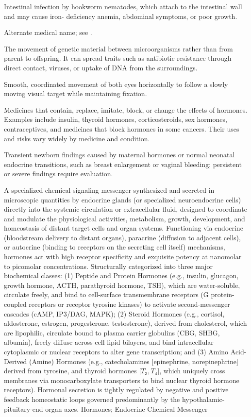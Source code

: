  Intestinal infection by hookworm nematodes, which attach to the intestinal wall and may cause iron-
deficiency anemia, abdominal symptoms, or poor growth.

 Alternate medical name; see .

 The movement of genetic material between microorganisms rather than from parent to offspring. It can spread traits such as antibiotic resistance through direct contact, viruses, or uptake of DNA from the surroundings.

 Smooth, coordinated movement of both eyes horizontally to follow a slowly moving visual target while maintaining fixation.

 Medicines that contain, replace, imitate, block, or change the effects of hormones. Examples include insulin, thyroid hormones, corticosteroids, sex hormones, contraceptives, and medicines that block hormones in some cancers. Their uses and risks vary widely by medicine and condition.

 Transient newborn findings caused by maternal hormones or normal neonatal endocrine transitions, such as breast enlargement or vaginal bleeding; persistent or severe findings require evaluation.

 A specialized chemical signaling messenger synthesized and secreted in microscopic quantities by endocrine glands (or specialized neuroendocrine cells) directly into the systemic circulation or extracellular fluid, designed to coordinate and modulate the physiological activities, metabolism, growth, development, and homeostasis of distant target cells and organ systems. Functioning via endocrine (bloodstream delivery to distant organs), paracrine (diffusion to adjacent cells), or autocrine (binding to receptors on the secreting cell itself) mechanisms, hormones act with high receptor specificity and exquisite potency at nanomolar to picomolar concentrations. Structurally categorized into three major biochemical classes: (1) Peptide and Protein Hormones (e.g., insulin, glucagon, growth hormone, ACTH, parathyroid hormone, TSH), which are water-soluble, circulate freely, and bind to cell-surface transmembrane receptors (G protein-coupled receptors or receptor tyrosine kinases) to activate second-messenger cascades (cAMP, IP3/DAG, MAPK); (2) Steroid Hormones (e.g., cortisol, aldosterone, estrogen, progesterone, testosterone), derived from cholesterol, which are lipophilic, circulate bound to plasma carrier globulins (CBG, SHBG, albumin), freely diffuse across cell lipid bilayers, and bind intracellular cytoplasmic or nuclear receptors to alter gene transcription; and (3) Amino Acid-Derived (Amine) Hormones (e.g., catecholamines [epinephrine, norepinephrine] derived from tyrosine, and thyroid hormones [$T_3, T_4$], which uniquely cross membranes via monocarboxylate transporters to bind nuclear thyroid hormone receptors). Hormonal secretion is tightly regulated by negative and positive feedback homeostatic loops governed predominantly by the hypothalamic-pituitary-end organ axes.
\synonyms
Hormones; Endocrine Chemical Messenger

